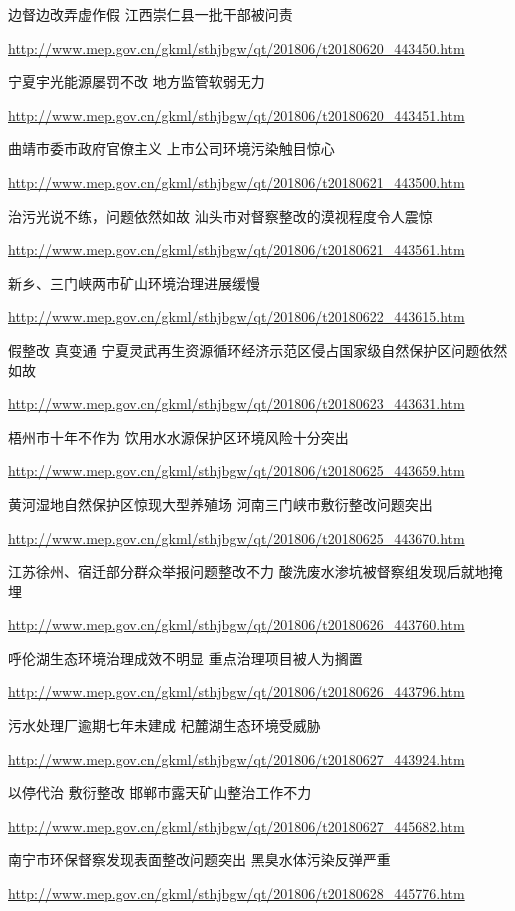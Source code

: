 \documentclass[]{book}
\begin{document}
边督边改弄虚作假 江西崇仁县一批干部被问责

\url{http://www.mep.gov.cn/gkml/sthjbgw/qt/201806/t20180620_443450.htm}

宁夏宇光能源屡罚不改 地方监管软弱无力

\url{http://www.mep.gov.cn/gkml/sthjbgw/qt/201806/t20180620_443451.htm}

曲靖市委市政府官僚主义 上市公司环境污染触目惊心

\url{http://www.mep.gov.cn/gkml/sthjbgw/qt/201806/t20180621_443500.htm}

治污光说不练，问题依然如故 汕头市对督察整改的漠视程度令人震惊

\url{http://www.mep.gov.cn/gkml/sthjbgw/qt/201806/t20180621_443561.htm}

新乡、三门峡两市矿山环境治理进展缓慢

\url{http://www.mep.gov.cn/gkml/sthjbgw/qt/201806/t20180622_443615.htm}

假整改 真变通
宁夏灵武再生资源循环经济示范区侵占国家级自然保护区问题依然如故

\url{http://www.mep.gov.cn/gkml/sthjbgw/qt/201806/t20180623_443631.htm}

梧州市十年不作为 饮用水水源保护区环境风险十分突出

\url{http://www.mep.gov.cn/gkml/sthjbgw/qt/201806/t20180625_443659.htm}

黄河湿地自然保护区惊现大型养殖场 河南三门峡市敷衍整改问题突出

\url{http://www.mep.gov.cn/gkml/sthjbgw/qt/201806/t20180625_443670.htm}

江苏徐州、宿迁部分群众举报问题整改不力
酸洗废水渗坑被督察组发现后就地掩埋

\url{http://www.mep.gov.cn/gkml/sthjbgw/qt/201806/t20180626_443760.htm}

呼伦湖生态环境治理成效不明显 重点治理项目被人为搁置

\url{http://www.mep.gov.cn/gkml/sthjbgw/qt/201806/t20180626_443796.htm}

污水处理厂逾期七年未建成 杞麓湖生态环境受威胁

\url{http://www.mep.gov.cn/gkml/sthjbgw/qt/201806/t20180627_443924.htm}

以停代治 敷衍整改 邯郸市露天矿山整治工作不力

\url{http://www.mep.gov.cn/gkml/sthjbgw/qt/201806/t20180627_445682.htm}

南宁市环保督察发现表面整改问题突出 黑臭水体污染反弹严重

\url{http://www.mep.gov.cn/gkml/sthjbgw/qt/201806/t20180628_445776.htm}
\end{document}
